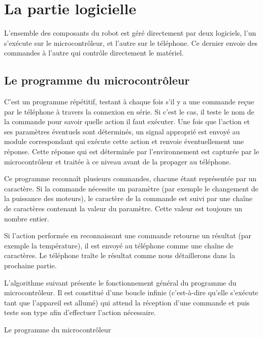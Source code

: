 \section{La partie logicielle}

L'ensemble des composants du robot est géré directement par deux logiciels, l'un
s'exécute sur le microcontrôleur, et l'autre sur le téléphone. Ce dernier
envoie des commandes à l'autre qui contrôle directement le matériel.

\subsection{Le programme du microcontrôleur}

C'est un programme répétitif, testant à chaque fois s'il y a
une commande reçue par le téléphone à travers la connexion en série. Si c'est le cas,
il teste le nom de la commande pour savoir quelle action il faut exécuter.
Une fois que l'action et ses paramètres éventuels sont déterminés, un signal
approprié est envoyé au module correspondant qui exécute cette action et renvoie
éventuellement une réponse. Cette réponse qui est déterminée par l'environnement
est capturée par le microcontrôleur et traitée à ce niveau avant de la propager
au téléphone.

Ce programme reconnaît plusieurs commandes, chacune étant représentée par un
caractère. Si la commande nécessite un paramètre (par exemple le changement de la
puissance des moteurs), le caractère de la commande est suivi par une chaîne de
caractères contenant la valeur du paramètre. Cette valeur est toujours un nombre
entier.

Si l'action performée en reconnaissant une commande retourne un résultat (par
exemple la température), il est envoyé au téléphone comme une chaîne de
caractères. Le téléphone traîte le résultat comme nous détaillerons dans la prochaine partie.

L'algorithme suivant présente le fonctionnement général du programme du
microcontrôleur. Il est constitué d'une boucle infinie (c'est-à-dire qu'elle
s'exécute tant que l'appareil est allumé) qui attend la réception d'une commande
et puis teste son type afin d'effectuer l'action nécessaire.

\smallskip

\begin{algorithm}[h]
\caption{Le programme du microcontrôleur}
\BlankLine
{}
\end{algorithm}

